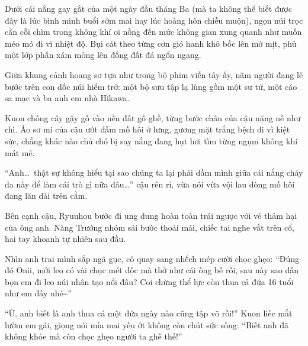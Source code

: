\documentclass[../main.tex]{subfiles}
\begin{document}
\color{black}


Dưới cái nắng gay gắt của một ngày đầu tháng Ba (mà ta không thể biết được đây là lúc bình minh buổi sớm mai hay lúc hoàng hôn chiều muộn), ngọn núi trọc cằn cỗi chìm trong không khí oi nồng đến mức không gian xung quanh như muốn méo mó đi vì nhiệt độ. Bụi cát theo từng cơn gió hanh khô bốc lên mờ mịt, phủ một lớp phấn xám mỏng lên đống đất đá ngổn ngang.

Giữa khung cảnh hoang sơ tựa như trong bộ phim viễn tây ấy, năm người đang lê bước trên con dốc núi hiểm trở: một bộ sưu tập lạ lùng gồm một sư tử, một cáo sa mạc và ba anh em nhà Hikawa.

Kuon chống cây gậy gỗ vào nền đất gồ ghề, từng bước chân của cậu nặng nề như chì. Áo sơ mi của cậu ướt đẫm mồ hôi ở lưng, gương mặt trắng bệch đi vì kiệt sức, chẳng khác nào chú chó bị say nắng đang hụt hơi tìm từng ngụm không khí mát mẻ.

``Anh\dots\ thật sự không hiểu tại sao chúng ta lại phải dầm mình giữa cái nắng cháy da này để làm cái trò gì nữa đâu\dots'' cậu rên rỉ, vừa nói vừa vội lau dòng mồ hôi đang lăn dài trên cằm.

Bên cạnh cậu, Ryuuhou bước đi ung dung hoàn toàn trái ngược với vẻ thảm hại của ông anh. Nàng Trưởng nhóm sải bước thoải mái, chiếc tai nghe vắt trên cổ, hai tay khoanh tự nhiên sau đầu.

Nhìn anh trai mình sắp ngã gục, cô quay sang nhếch mép cười chọc ghẹo: ``Đúng đó Onii, mới leo có vài chục mét dốc mà thở như cái ống bễ rồi, sau này sao dẫn bọn em đi leo núi nhân tạo nổi đâu? Coi chừng thể lực còn thua cả đứa 16 tuổi như em đấy nhé\~{}''

``Ừ, anh biết là anh thua cả một đứa ngày nào cũng tập võ rồi!'' Kuon liếc mắt lườm em gái, giọng nói mỉa mai yếu ớt không còn chút sức sống: ``Biết anh đã không khỏe mà còn chọc ghẹo người ta ghê thế!''
\end{document}

